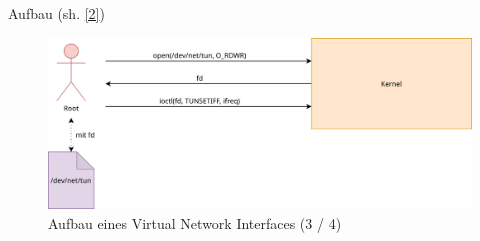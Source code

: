 \documentclass[ngerman,aspectratio=169]{beamer}
\begin{document}
\begin{frame}{Aufbau (sh. \hyperlink{ref:backref}{[2]})}
{\begin{figure}
				\includegraphics[width=\textwidth]{open_tun03}
				\caption{Aufbau eines Virtual Network Interfaces (3 / 4)}
			\end{figure}
		}
	\end{frame}
\end{document}
